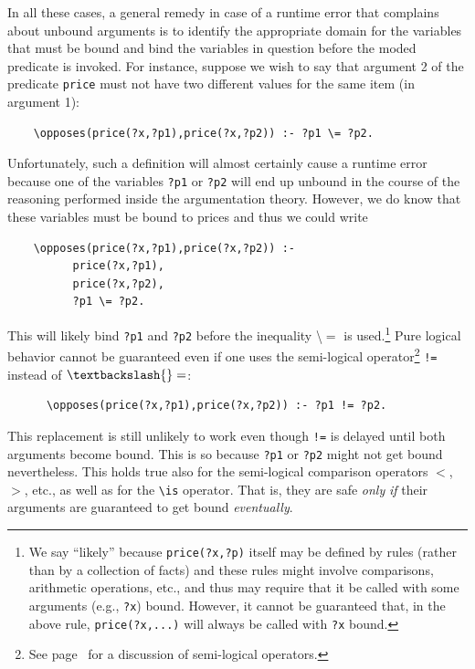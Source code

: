 \documentclass[11pt]{article}
\newcommand{\bs}{\textbackslash}
\begin{document}
\begin{itemize}
  In all these cases, a general remedy in case of a runtime error
  that complains about unbound arguments
  is to identify the appropriate
  domain for the variables that must be bound and bind the variables in
  question before the moded predicate is invoked. For instance, suppose we
  wish to say that argument 2 of the predicate \texttt{price}  
  must not have two different values for the same item (in argument 1):
\begin{verbatim}
    \opposes(price(?x,?p1),price(?x,?p2)) :- ?p1 \= ?p2.
\end{verbatim}
  Unfortunately, such a definition will almost certainly cause a runtime error because one
  of the variables \texttt{?p1} or \texttt{?p2} will end up unbound in the course of
  the reasoning performed inside the argumentation theory.  
  However, we do know that these variables must be bound to
  prices and thus we could write
\begin{verbatim}
    \opposes(price(?x,?p1),price(?x,?p2)) :-
          price(?x,?p1),
          price(?x,?p2),
          ?p1 \= ?p2.
\end{verbatim}
  This will likely bind \texttt{?p1} and \texttt{?p2} before the
  inequality \bs$=$ is used.\footnote{
    We say ``likely'' because \texttt{price(?x,?p)} itself may be defined
    by rules (rather than by a collection of facts)
    and these rules might involve comparisons, arithmetic operations, etc., and thus
    may require that it be called with some arguments (e.g., \texttt{?x})
    bound. However, it cannot be guaranteed that, in the above rule,
    \texttt{price(?x,...)}  will always be called with \texttt{?x} bound. 
  }
  Pure logical behavior cannot be guaranteed even if one uses the
  semi-logical operator\footnote{
    See page~\pageref{pg-semi-logical} for a discussion of semi-logical
    operators.
  }
  \texttt{!=} instead of $\bs{}=$:
\begin{verbatim}
      \opposes(price(?x,?p1),price(?x,?p2)) :- ?p1 != ?p2.
\end{verbatim}
  This replacement is still unlikely to work even though \texttt{!=} is delayed until both
  arguments become bound. This is so because \texttt{?p1} or \texttt{?p2}
  might not get bound nevertheless.
  This holds true also for the semi-logical comparison operators $<$, $>$,
  etc., as well as for the
  \texttt{\bs{}is} operator. That is, they are
  safe \emph{only} \emph{if} their
  arguments are guaranteed to get bound \emph{eventually}.  
\end{itemize}
\end{document}
